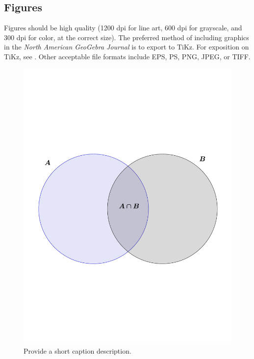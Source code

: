 \subsection{Figures}
Figures should be high quality (1200 dpi for line art, 600 dpi for grayscale, and 300 dpi for color, at the correct size). 
The preferred method of including graphics in the \textit{North American GeoGebra Journal} is to export to TiKz.  
For exposition on TiKz, see \citep{quinlan2013geogebra}.   
Other acceptable file formats include EPS, PS, PNG, JPEG, or TIFF.  
  
 \begin{figure}[h!] %
    \centering
    \includegraphics[scale=0.5]{figs/venn.pdf} 
    \caption{Provide a short caption description.}
    \label{fig:number}
 \end{figure}
 
 
